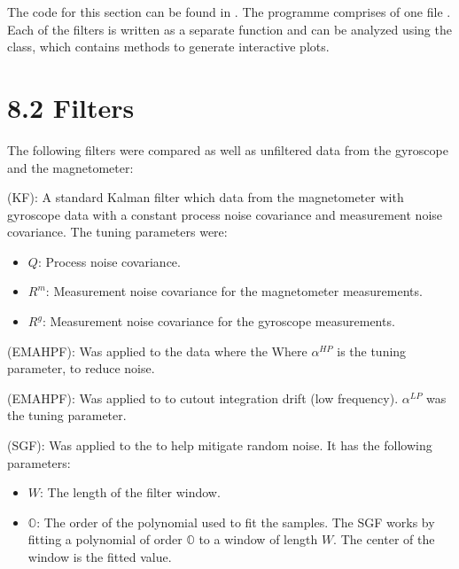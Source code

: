 \documentclass[letterpaper,10pt,english]{jupyterBook}
\begin{document}
\sphinxAtStartPar
The code for this section can be found in . The programme comprises of one file . Each of the filters is written as a separate function and can be analyzed using the  class, which contains methods to generate interactive plots.


\section{8.2 Filters}
\label{\detokenize{8TestingFilters:filters}}
\sphinxAtStartPar
The following filters were compared as well as unfiltered data from the gyroscope and the magnetometer:

\sphinxAtStartPar
{} (KF): A standard Kalman filter which  data from the magnetometer with gyroscope data with a constant process noise covariance and measurement noise covariance. The tuning parameters were:
\begin{itemize}
\item {} 
\sphinxAtStartPar
\(Q\): Process noise covariance.

\item {} 
\sphinxAtStartPar
\(R^m\): Measurement noise covariance for the magnetometer measurements.

\item {} 
\sphinxAtStartPar
\(R^g\): Measurement noise covariance for the gyroscope measurements.

\end{itemize}

\sphinxAtStartPar
{} (EMAHPF): Was applied to the  data where the Where \(\alpha^{HP}\) is the tuning parameter, to reduce noise.

\sphinxAtStartPar
{} (EMAHPF): Was applied to  to cutout integration drift (low frequency). \(\alpha^{LP}\) was the tuning parameter.

\sphinxAtStartPar
{} (SGF): Was applied to the  to help mitigate random noise. It has the following parameters:
\begin{itemize}
\item {} 
\sphinxAtStartPar
\(W\): The length of the filter window.

\item {} 
\sphinxAtStartPar
\(\mathbb{O}\): The order of the polynomial used to fit the samples.
The SGF works by fitting a polynomial of order \(\mathbb{O}\) to a window of length \(W\). The center of the window is the fitted value.

\end{itemize}
\end{document}
